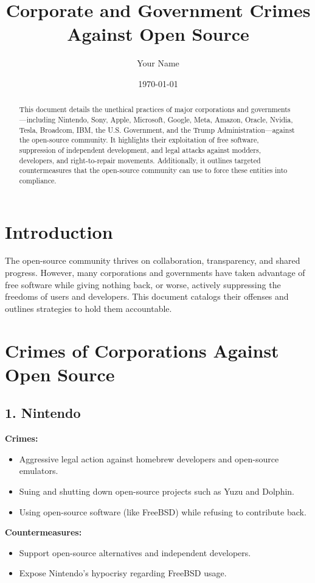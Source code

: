 \documentclass[12pt]{article}
\title{Corporate and Government Crimes Against Open Source}
\author{Your Name}
\date{\today}
\begin{document}
\maketitle

\begin{abstract}
This document details the unethical practices of major corporations and governments—including Nintendo, Sony, Apple, Microsoft, Google, Meta, Amazon, Oracle, Nvidia, Tesla, Broadcom, IBM, the U.S. Government, and the Trump Administration—against the open-source community. It highlights their exploitation of free software, suppression of independent development, and legal attacks against modders, developers, and right-to-repair movements. Additionally, it outlines targeted countermeasures that the open-source community can use to force these entities into compliance.
\end{abstract}

\section{Introduction}
The open-source community thrives on collaboration, transparency, and shared progress. However, many corporations and governments have taken advantage of free software while giving nothing back, or worse, actively suppressing the freedoms of users and developers. This document catalogs their offenses and outlines strategies to hold them accountable.

\newpage
\section{Crimes of Corporations Against Open Source}

\subsection{1. Nintendo}
\textbf{Crimes:}
\begin{itemize}
    \item Aggressive legal action against homebrew developers and open-source emulators.
    \item Suing and shutting down open-source projects such as Yuzu and Dolphin.
    \item Using open-source software (like FreeBSD) while refusing to contribute back.
\end{itemize}

\textbf{Countermeasures:}
\begin{itemize}
    \item Support open-source alternatives and independent developers.
    \item Expose Nintendo’s hypocrisy regarding FreeBSD usage.
\end{itemize}
\end{document}
